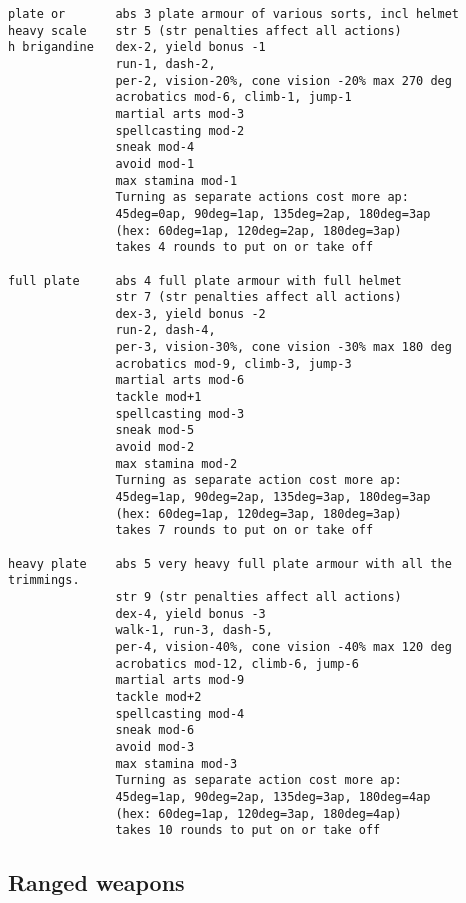 \begin{verbatim}
plate or       abs 3 plate armour of various sorts, incl helmet
heavy scale    str 5 (str penalties affect all actions)
h brigandine   dex-2, yield bonus -1
               run-1, dash-2,
               per-2, vision-20%, cone vision -20% max 270 deg
               acrobatics mod-6, climb-1, jump-1
               martial arts mod-3
               spellcasting mod-2
               sneak mod-4
               avoid mod-1
               max stamina mod-1
               Turning as separate actions cost more ap:
               45deg=0ap, 90deg=1ap, 135deg=2ap, 180deg=3ap
               (hex: 60deg=1ap, 120deg=2ap, 180deg=3ap)
               takes 4 rounds to put on or take off

full plate     abs 4 full plate armour with full helmet
               str 7 (str penalties affect all actions)
               dex-3, yield bonus -2
               run-2, dash-4,
               per-3, vision-30%, cone vision -30% max 180 deg
               acrobatics mod-9, climb-3, jump-3
               martial arts mod-6
               tackle mod+1
               spellcasting mod-3
               sneak mod-5
               avoid mod-2
               max stamina mod-2
               Turning as separate action cost more ap:
               45deg=1ap, 90deg=2ap, 135deg=3ap, 180deg=3ap
               (hex: 60deg=1ap, 120deg=3ap, 180deg=3ap)
               takes 7 rounds to put on or take off

heavy plate    abs 5 very heavy full plate armour with all the trimmings.
               str 9 (str penalties affect all actions)
               dex-4, yield bonus -3
               walk-1, run-3, dash-5,
               per-4, vision-40%, cone vision -40% max 120 deg
               acrobatics mod-12, climb-6, jump-6
               martial arts mod-9
               tackle mod+2
               spellcasting mod-4
               sneak mod-6
               avoid mod-3
               max stamina mod-3
               Turning as separate action cost more ap:
               45deg=1ap, 90deg=2ap, 135deg=3ap, 180deg=4ap
               (hex: 60deg=1ap, 120deg=3ap, 180deg=4ap)
               takes 10 rounds to put on or take off

\end{verbatim}
\normalsize



\subsection*{Ranged weapons}

